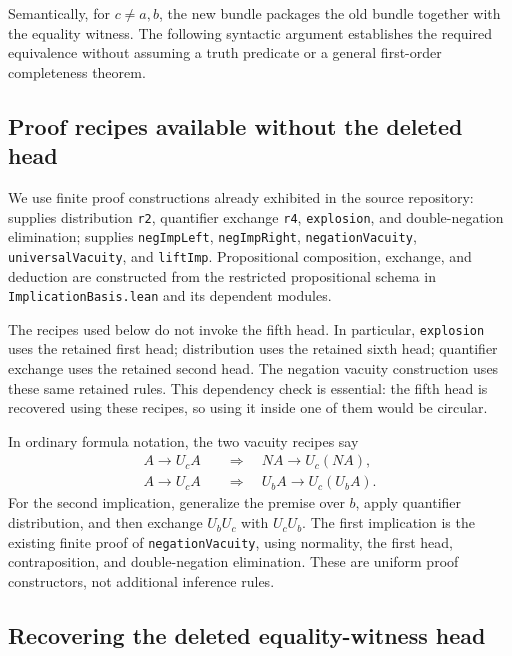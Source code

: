 Semantically, for $c\ne a,b$, the new bundle packages the old bundle together
with the equality witness.  The following syntactic argument establishes the
required equivalence without assuming a truth predicate or a general
first-order completeness theorem.

\subsection{Proof recipes available without the deleted head}

We use finite proof constructions already exhibited in the source repository:
 supplies distribution \texttt{r2},
quantifier exchange \texttt{r4}, \texttt{explosion}, and double-negation
elimination;  supplies
\texttt{negImpLeft}, \texttt{negImpRight}, \texttt{negationVacuity},
\texttt{universalVacuity}, and \texttt{liftImp}.  Propositional composition,
exchange, and deduction are constructed from the restricted propositional
schema in \texttt{ImplicationBasis.lean} and its dependent modules.

The recipes used below do not invoke the fifth head.  In particular,
\texttt{explosion} uses the retained first head; distribution uses the retained
sixth head; quantifier exchange uses the retained second head.  The negation
vacuity construction uses these same retained rules.  This dependency check
is essential: the fifth head is recovered using these recipes, so using it
inside one of them would be circular.

In ordinary formula notation, the two vacuity recipes say
\begin{align}
 A\to U_c A &\quad\Longrightarrow\quad N A\to U_c(N A),
 \label{eq:negative-vacuity-integrated}\\
 A\to U_c A &\quad\Longrightarrow\quad U_b A\to U_c(U_b A).
 \label{eq:universal-vacuity-integrated}
\end{align}
For the second implication, generalize the premise over $b$, apply
quantifier distribution, and then exchange $U_bU_c$ with $U_cU_b$.  The first
implication is the existing finite proof of \texttt{negationVacuity}, using
normality, the first head, contraposition, and double-negation elimination.
These are uniform proof constructors, not additional inference rules.

\subsection{Recovering the deleted equality-witness head}

